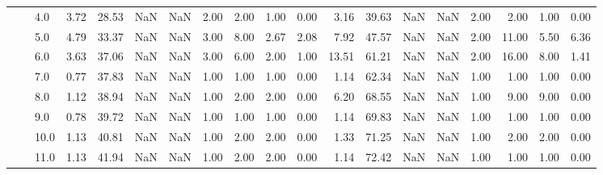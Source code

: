 \begin{tabular}{lllrrrrrrrrrrrrrrrr}
       &     & 4.0  &      3.72 &      28.53 &               NaN &                NaN &  2.00 &   2.00 &             1.00 &                         0.00 &      3.16 &      39.63 &               NaN &                NaN & 2.00 &   2.00 &             1.00 &                         0.00 \\
       &     & 5.0  &      4.79 &      33.37 &               NaN &                NaN &  3.00 &   8.00 &             2.67 &                         2.08 &      7.92 &      47.57 &               NaN &                NaN & 2.00 &  11.00 &             5.50 &                         6.36 \\
       &     & 6.0  &      3.63 &      37.06 &               NaN &                NaN &  3.00 &   6.00 &             2.00 &                         1.00 &     13.51 &      61.21 &               NaN &                NaN & 2.00 &  16.00 &             8.00 &                         1.41 \\
       &     & 7.0  &      0.77 &      37.83 &               NaN &                NaN &  1.00 &   1.00 &             1.00 &                         0.00 &      1.14 &      62.34 &               NaN &                NaN & 1.00 &   1.00 &             1.00 &                         0.00 \\
       &     & 8.0  &      1.12 &      38.94 &               NaN &                NaN &  1.00 &   2.00 &             2.00 &                         0.00 &      6.20 &      68.55 &               NaN &                NaN & 1.00 &   9.00 &             9.00 &                         0.00 \\
       &     & 9.0  &      0.78 &      39.72 &               NaN &                NaN &  1.00 &   1.00 &             1.00 &                         0.00 &      1.14 &      69.83 &               NaN &                NaN & 1.00 &   1.00 &             1.00 &                         0.00 \\
       &     & 10.0 &      1.13 &      40.81 &               NaN &                NaN &  1.00 &   2.00 &             2.00 &                         0.00 &      1.33 &      71.25 &               NaN &                NaN & 1.00 &   2.00 &             2.00 &                         0.00 \\
       &     & 11.0 &      1.13 &      41.94 &               NaN &                NaN &  1.00 &   2.00 &             2.00 &                         0.00 &      1.14 &      72.42 &               NaN &                NaN & 1.00 &   1.00 &             1.00 &                         0.00 \\

\end{tabular}
